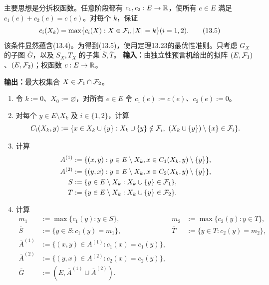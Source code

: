 主要思想是分拆权函数。任意阶段都有 $c_1,c_2:E\to\mathbb R$，使所有 $e\in E$ 满足 $c_1(e)+c_2(e)=c(e)$。对每个 $k$，保证
\[c_i(X_k)=\max\{c_i(X):X\in\mathcal F_i,|X|=k\}(i=1,2).\tag{13.5}\]
该条件显然蕴含(13.4)。为得到(13.5)，使用定理13.23的最优性准则。只考虑 $G_X$ 的子图 $\overline G$，以及 $S_X,T_X$ 的子集 $\overline S,\overline T$。
\textbf{输入：}由独立性预言机给出的拟阵 $(E,\mathcal F_1)$、$(E,\mathcal F_2)$；权函数 $c:E\to\mathbb R$。\par
\textbf{输出：}最大权集合 $X\in\mathcal F_1\cap\mathcal F_2$。
\begin{enumerate}[label=\arabic*.]
\item 令 $k:=0$、$X_0:=\varnothing$，对所有 $e\in E$ 令 $c_1(e):=c(e)$、$c_2(e):=0$。
\item 对每个 $y\in E\setminus X_k$ 及 $i\in\{1,2\}$，计算
\[C_i(X_k,y):=\{x\in X_k\cup\{y\}:X_k\cup\{y\}\notin\F_i,\ (X_k\cup\{y\})\setminus\{x\}\in\F_i\}.\]
\item 计算
\begin{align*}
A^{(1)}&:=\{(x,y):y\in E\setminus X_k,x\in C_1(X_k,y)\setminus\{y\}\},\\
A^{(2)}&:=\{(y,x):y\in E\setminus X_k,x\in C_2(X_k,y)\setminus\{y\}\},\\
S&:=\{y\in E\setminus X_k:X_k\cup\{y\}\in\mathcal F_1\},\\
T&:=\{y\in E\setminus X_k:X_k\cup\{y\}\in\mathcal F_2\}.
\end{align*}
\item 计算
\begin{align*}
m_1&:=\max\{c_1(y):y\in S\},&m_2&:=\max\{c_2(y):y\in T\},\\
\overline S&:=\{y\in S:c_1(y)=m_1\},&\overline T&:=\{y\in T:c_2(y)=m_2\},\\
\overline A^{(1)}&:=\{(x,y)\in A^{(1)}:c_1(x)=c_1(y)\},\\
\overline A^{(2)}&:=\{(y,x)\in A^{(2)}:c_2(x)=c_2(y)\},\\
\overline G&:=(E,\overline A^{(1)}\cup\overline A^{(2)}).
\end{align*}
\end{enumerate}

